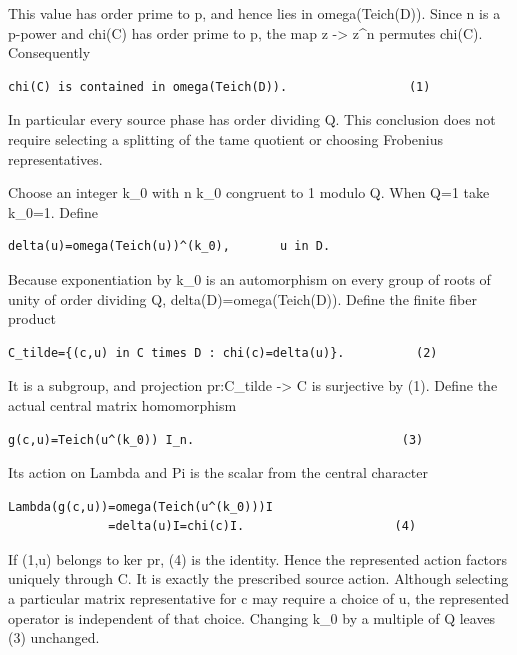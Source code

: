 This value has order prime to p, and hence lies in omega(Teich(D)).
Since n is a p-power and chi(C) has order prime to p, the map z
-\textgreater{} z\^{}n permutes chi(C). Consequently

\begin{Verbatim}[fontsize=\small,breaklines=true,breakanywhere=true]
chi(C) is contained in omega(Teich(D)).                 (1)
\end{Verbatim}

In particular every source phase has order dividing Q. This conclusion
does not require selecting a splitting of the tame quotient or choosing
Frobenius representatives.

Choose an integer k\_0 with n k\_0 congruent to 1 modulo Q. When Q=1 take
k\_0=1. Define

\begin{Verbatim}[fontsize=\small,breaklines=true,breakanywhere=true]
delta(u)=omega(Teich(u))^(k_0),       u in D.
\end{Verbatim}

Because exponentiation by k\_0 is an automorphism on every group of
roots of unity of order dividing Q, delta(D)=omega(Teich(D)). Define the
finite fiber product

\begin{Verbatim}[fontsize=\small,breaklines=true,breakanywhere=true]
C_tilde={(c,u) in C times D : chi(c)=delta(u)}.          (2)
\end{Verbatim}

It is a subgroup, and projection pr:C\_tilde -\textgreater{} C is
surjective by (1). Define the actual central matrix homomorphism

\begin{Verbatim}[fontsize=\small,breaklines=true,breakanywhere=true]
g(c,u)=Teich(u^(k_0)) I_n.                             (3)
\end{Verbatim}

Its action on Lambda and Pi is the scalar from the central character

\begin{Verbatim}[fontsize=\small,breaklines=true,breakanywhere=true]
Lambda(g(c,u))=omega(Teich(u^(k_0)))I
              =delta(u)I=chi(c)I.                     (4)
\end{Verbatim}

If (1,u) belongs to ker pr, (4) is the identity. Hence the represented
action factors uniquely through C. It is exactly the prescribed source
action. Although selecting a particular matrix representative for c may
require a choice of u, the represented operator is independent of that
choice. Changing k\_0 by a multiple of Q leaves (3) unchanged.

